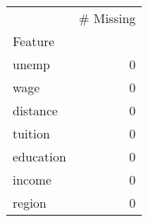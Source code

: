 \begin{tabu}{lr}
\toprule
 & # Missing \\
Feature &  \\
\midrule
unemp & 0 \\
wage & 0 \\
distance & 0 \\
tuition & 0 \\
education & 0 \\
income & 0 \\
region & 0 \\
\bottomrule
\end{tabu}
